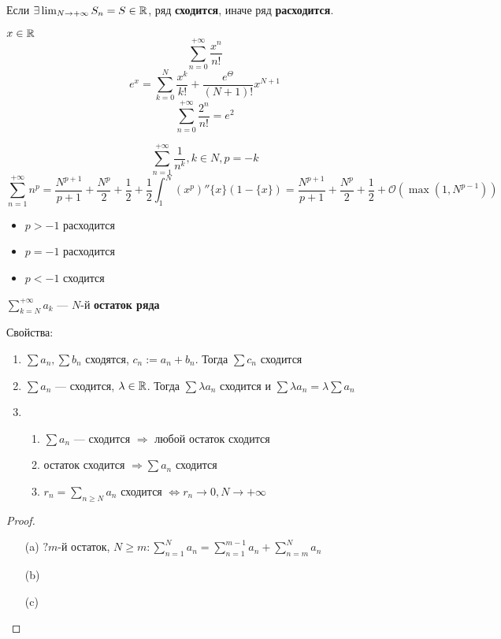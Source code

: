 Если $\exists \lim_{N\to+\infty} S_n=S\in\mathbb{R}$, ряд \textbf{сходится}, иначе ряд \textbf{расходится}.

\begin{example}
    $x\in\mathbb{R}$
    $$\sum_{n=0}^{+\infty} \frac{x^n}{n!}$$
    $$e^x = \sum_{k=0}^N \frac{x^k}{k!} + \frac{e^{\Theta}}{(N+1)!}x^{N+1}$$
    $$\sum_{n=0}^{+\infty} \frac{2^n}{n!}=e^2$$
\end{example}

\begin{example}
    $$\sum_{n=1}^{+\infty}\frac{1}{n^k}, k\in N, p=-k$$
    $$\sum_{n=1}^{+\infty}n^p = \frac{N^{p+1}}{p+1} + \frac{N^p}{2} + \frac{1}{2} + \frac{1}{2} \int_1^N (x^p)''\{x\}(1-\{x\})=\frac{N^{p+1}}{p+1} + \frac{N^p}{2} + \frac{1}{2} + \mathcal O(\max (1, N^{p-1}))$$
    \begin{itemize}
        \item $p > -1$ расходится
        \item $p = -1$ расходится
        \item $p < -1$ сходится
    \end{itemize}
\end{example}

\begin{definition}
    $\sum\limits_{k=N}^{+\infty} a_k$ --- $N$-й \textbf{остаток ряда}
\end{definition}

Свойства:
\begin{enumerate}
    \item $\sum a_n, \sum b_n$ сходятся, $c_n:=a_n+b_n$. Тогда $\sum c_n$ сходится
    \item $\sum a_n$ --- сходится, $\lambda\in\mathbb{R}$. Тогда $\sum \lambda a_n$ сходится и $\sum \lambda a_n = \lambda \sum a_n$
    \item \begin{enumerate}
        \item $\sum a_n$ --- сходится $\Rightarrow$ любой остаток сходится
        \item остаток сходится $\Rightarrow \sum a_n$ сходится
        \item $r_n = \sum\limits_{n\geq N} a_n$ сходится $\Leftrightarrow r_n\to 0, N\to+\infty$
    \end{enumerate}
\end{enumerate}
\begin{proof}
    \begin{itemize}
        \item [(a)] $?m$-й остаток, $N\geq m : \sum\limits_{n=1}^N a_n = \sum\limits_{n=1}^{m-1} a_n + \sum\limits_{n=m}^N a_n$
        \item [(b)] 
        \item [(c)]
    \end{itemize}
\end{proof}

